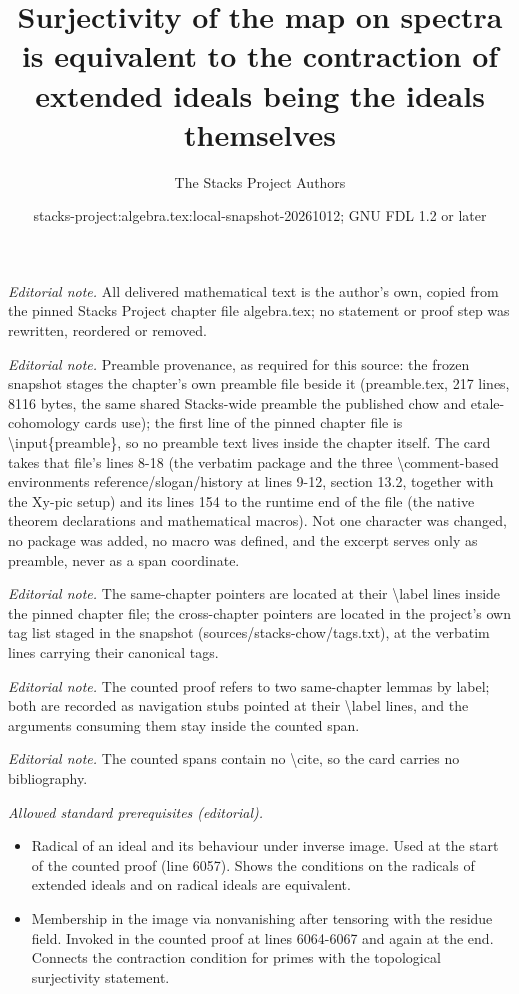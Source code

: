 \documentclass[10pt,a4paper]{amsart}
\title{Surjectivity of the map on spectra is equivalent to the contraction of extended ideals being the ideals themselves}
\author{The Stacks Project Authors}
\date{stacks-project:algebra.tex:local-snapshot-20261012; GNU FDL 1.2 or later}
\theoremstyle{plain}
\theoremstyle{definition}
\theoremstyle{remark}
\numberwithin{equation}{subsection}
\begin{document}
\maketitle
\noindent\textit{Editorial note.} All delivered mathematical text is the author's own, copied from the pinned Stacks Project chapter file algebra.tex; no statement or proof step was rewritten, reordered or removed.\par\medskip
\noindent\textit{Editorial note.} Preamble provenance, as required for this source: the frozen snapshot stages the chapter's own preamble file beside it (preamble.tex, 217 lines, 8116 bytes, the same shared Stacks-wide preamble the published chow and etale-cohomology cards use); the first line of the pinned chapter file is \textbackslash{}input\{preamble\}, so no preamble text lives inside the chapter itself. The card takes that file's lines 8-18 (the verbatim package and the three \textbackslash{}comment-based environments reference/slogan/history at lines 9-12, section 13.2, together with the Xy-pic setup) and its lines 154 to the runtime end of the file (the native theorem declarations and mathematical macros). Not one character was changed, no package was added, no macro was defined, and the excerpt serves only as preamble, never as a span coordinate.\par\medskip
\noindent\textit{Editorial note.} The same-chapter pointers are located at their \textbackslash{}label lines inside the pinned chapter file; the cross-chapter pointers are located in the project's own tag list staged in the snapshot (sources/stacks-chow/tags.txt), at the verbatim lines carrying their canonical tags.\par\medskip
\noindent\textit{Editorial note.} The counted proof refers to two same-chapter lemmas by label; both are recorded as navigation stubs pointed at their \textbackslash{}label lines, and the arguments consuming them stay inside the counted span.\par\medskip
\noindent\textit{Editorial note.} The counted spans contain no \textbackslash{}cite, so the card carries no bibliography.\par\medskip
\noindent\textit{Allowed standard prerequisites (editorial).}\begin{itemize}
\item Radical of an ideal and its behaviour under inverse image. Used at the start of the counted proof (line 6057). Shows the conditions on the radicals of extended ideals and on radical ideals are equivalent.
\item Membership in the image via nonvanishing after tensoring with the residue field. Invoked in the counted proof at lines 6064-6067 and again at the end. Connects the contraction condition for primes with the topological surjectivity statement.
\end{itemize}\medskip
\end{document}
